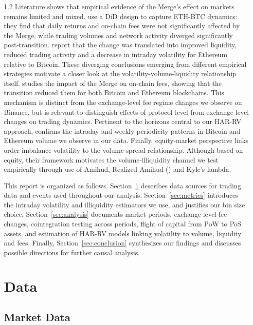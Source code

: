 \documentclass[10pt]{article}
\begin{document}
\begin{setstretch}{1.2}
Literature shows that empirical evidence of the Merge's effect on markets remains limited and mixed. \textcite{Tsuyuguchi2025} use a DiD design to capture ETH-BTC dynamics: they find that daily returns and on-chain fees were not significantly affected by the Merge, while trading volumes and network activity diverged significantly post-transition. \textcite{Liu2025} report that the change was translated into improved liquidity, reduced trading activity and a decrease in intraday volatility for Ethereum relative to Bitcoin. These diverging conclusions emerging from different empirical strategies motivate a closer look at the volatility-volume-liquidity relationship itself. \textcite{Jain2023} studies the impact of the Merge on on-chain fees, showing that the transition reduced them for both Bitcoin and Ethereum blockchains. This mechanism is distinct from the exchange-level fee regime changes we observe on Binance, but is relevant to distinguish effects of protocol-level from exchange-level changes on trading dynamics. Pertinent to the horizons central to our HAR-RV approach, \textcite{Hansen2024} confirms the intraday and weekly periodicity patterns in Bitcoin and Ethereum volume we observe in our data. Finally, \textcite{Bogousslavsky2023} equity-market perspective links order imbalance volatility to the volume-spread relationship. Although based on equity, their framework motivates the volume-illiquidity channel we test empirically through use of Amihud, Realized Amihud (\cite{Ranaldo2022}) and Kyle's lambda.

This report is organized as follows. Section~\ref{sec:data} describes data sources for trading data and events used throughout our analysis. Section~\ref{sec:metrics} introduces the intraday volatility and illiquidity estimators we use, and justifies our bin size choice. Section~\ref{sec:analysis} documents market periods, exchange-level fee changes, cointegration testing across periods, flight of capital from PoW to PoS assets, and estimation of HAR-RV models linking volatility to volume, liquidity and fees. Finally, Section~\ref{sec:conclusion} synthesizes our findings and discusses possible directions for further causal analysis.

\section{Data}
\label{sec:data}
    \subsection{Market Data}


\end{setstretch}
\end{document}
